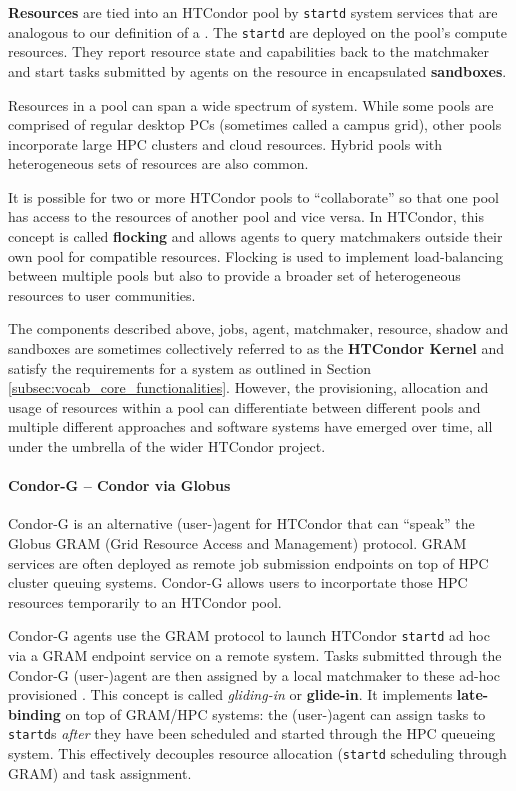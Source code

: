 \documentclass{sig-alternate}
\begin{document}
\textbf{Resources} are tied into an HTCondor pool by \texttt{startd} system
services that are analogous to our definition of a \pilot. The \texttt{startd}
\pilots are deployed on the pool's compute resources. They report resource
state and  capabilities back to the matchmaker and start tasks submitted by
agents on the resource in encapsulated \textbf{sandboxes}.

Resources in a pool can span a wide spectrum of system. While some pools are
comprised of regular desktop PCs (sometimes called a campus grid), other pools
incorporate large HPC clusters and cloud resources. Hybrid pools with
heterogeneous sets of resources are also common.

It is possible for two or more HTCondor pools to ``collaborate'' so that one
pool has access to the resources of another pool and vice versa. In HTCondor,
this concept is called \textbf{flocking} and allows agents to query
matchmakers outside their own pool for compatible resources. Flocking is used
to implement load-balancing between multiple pools but also to provide a
broader set of heterogeneous resources to user communities.

The components described above, jobs, agent, matchmaker, resource, shadow and
sandboxes are sometimes collectively referred to as the \textbf{HTCondor
Kernel} and satisfy the requirements for a \pilotjob system as outlined in
Section \ref{subsec:vocab_core_functionalities}. However, the provisioning,
allocation and usage of resources within a pool can differentiate between
different pools and multiple different approaches and software systems have
emerged over time, all under the umbrella of the wider HTCondor project.

%
\paragraph{Condor-G -- Condor via Globus}

Condor-G is an alternative (user-)agent for HTCondor that can ``speak'' the
Globus GRAM (Grid Resource Access and Management) protocol. GRAM services are
often deployed as remote job submission endpoints on top of HPC cluster
queuing systems. Condor-G allows users to incorportate those HPC resources
temporarily to an HTCondor pool.

Condor-G agents use the GRAM protocol to launch HTCondor \texttt{startd}
\pilots ad hoc via a GRAM endpoint service on a remote system. Tasks submitted
through the Condor-G (user-)agent are then assigned by a local matchmaker to
these ad-hoc provisioned \pilots. This concept is called \textit {gliding-in}
or \textbf{glide-in}. It implements \textbf{late-binding} on top of GRAM/HPC
systems: the (user-)agent can assign tasks to \texttt{startd}s \textit{after}
they have been scheduled and started through the HPC queueing system. This
effectively decouples resource allocation (\texttt{startd} scheduling through
GRAM) and task assignment.
\end{document}
